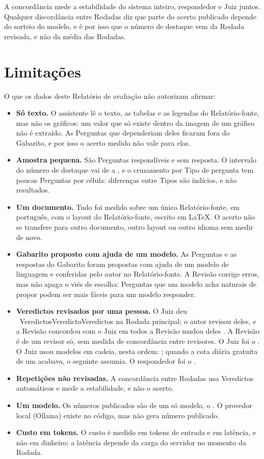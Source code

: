 \documentclass[11pt,a4paper]{article}
\newcommand{\contagem}[3]{%
  #1~\ifcase#1\relax #3\or #2\else #3\fi}
\newcommand{\RevisaoMudou}{%
  \ifcase\NumRevisaoVeredictosMudados\relax
    a Revisão concordou com o Juiz em todos%
  \else
    a Revisão mudou \NumRevisaoVeredictosMudados{} deles%
  \fi}
\newcommand{\JuizDaRodada}{%
  \ifcase\NumParametrosNModelosJuiz\relax
  \or
    O Juiz foi o \texttt{\NumParametrosModeloJuiz}.%
  \else
    O Juiz usou \NumParametrosNModelosJuiz{} modelos em cadeia, nesta
    ordem: \NumParametrosModeloJuiz; quando a cota diária gratuita de um
    acabava, o seguinte assumia.%
  \fi}
\begin{document}
A concordância mede a estabilidade do sistema inteiro, respondedor e Juiz
juntos. Qualquer discordância entre Rodadas diz que parte do acerto
publicado depende do sorteio do modelo, e é por isso que o
número de destaque vem da Rodada revisada, e não da média das Rodadas.

\section{Limitações}

O que os dados deste Relatório de avaliação não autorizam afirmar:

\begin{itemize}[leftmargin=*, itemsep=3pt]
  \item \textbf{Só texto.} O assistente lê o texto, as tabelas e as legendas
    do Relatório-fonte, mas não os gráficos: um valor que só existe dentro
    da imagem de um gráfico não é extraído. As Perguntas que dependeriam
    deles ficaram fora do Gabarito, e por isso o acerto medido não vale
    para elas.
  \item \textbf{Amostra pequena.} São \NumGabaritoNRespondiveis{} Perguntas
    respondíveis e \NumGabaritoNSemResposta{} sem resposta. O intervalo do
    número de destaque vai de \NumDestaqueAcertoComRagInf{} a
    \NumDestaqueAcertoComRagSup, e o cruzamento por Tipo de pergunta tem
    poucas Perguntas por célula: diferenças entre Tipos são indícios, e não
    resultados.
  \item \textbf{Um documento.} Tudo foi medido sobre um único Relatório-fonte,
    em português, com o layout do Relatório-fonte, escrito em LaTeX. O acerto não se
    transfere para outro documento, outro layout ou outro idioma sem medir
    de novo.
  \item \textbf{Gabarito proposto com ajuda de um modelo.} As Perguntas e as
    respostas do Gabarito foram propostas com ajuda de um modelo de
    linguagem e conferidas pelo autor no Relatório-fonte. A Revisão corrige erros, mas
    não apaga o viés de escolha: Perguntas que um modelo acha naturais de
    propor podem ser mais fáceis para um modelo responder.
  \item \textbf{Veredictos revisados por uma pessoa.} O Juiz deu
    \contagem{\NumRevisaoVeredictosJuiz}{Veredicto}{Veredictos} na Rodada
    principal; o autor revisou \NumRevisaoVeredictosRevisados{} deles, e
    \RevisaoMudou. A Revisão é de um revisor só, sem medida
    de concordância entre revisores. \JuizDaRodada{} O respondedor foi o
    \texttt{\NumParametrosModeloRespondedor}.
  \item \textbf{Repetições não revisadas.} A concordância entre Rodadas usa
    Veredictos automáticos e mede a estabilidade, e não o acerto.
  \item \textbf{Um modelo.} Os números publicados são de um só modelo, o
    \texttt{\NumParametrosModeloRespondedor}. O provedor local (Ollama)
    existe no código, mas não gera número publicado.
  \item \textbf{Custo em tokens.} O custo é medido em tokens de entrada e em
    latência, e não em dinheiro; a latência depende da carga do servidor
    no momento da Rodada.
\end{itemize}
\end{document}
